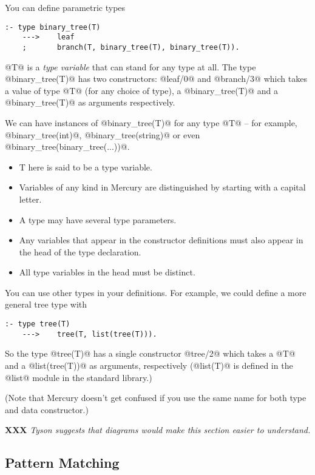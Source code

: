 \documentclass[a4paper,11pt,notitlepage,onecolumn]{article}
\newcommand{\XXX}[1]%
{{\small\textbf{XXX} \emph{#1}}}
\begin{document}
You can define parametric types
\begin{verbatim}
:- type binary_tree(T)
    --->    leaf
    ;       branch(T, binary_tree(T), binary_tree(T)).
\end{verbatim}

@T@ is a \emph{type variable} that can stand for any type at all.
The type @binary_tree(T)@ has two constructors: @leaf/0@ and
@branch/3@ which takes a value of type @T@ (for any choice of
type), a @binary_tree(T)@ and a @binary_tree(T)@ as arguments
respectively.

We can have instances of @binary_tree(T)@ for any type @T@ -- for
example, @binary_tree(int)@, @binary_tree(string)@ or even
@binary_tree(binary_tree(...))@.

\begin{itemize}
\item T here is said to be a type variable.
\item Variables of any kind in Mercury are distinguished by
  starting with a capital letter.
\item A type may have several type parameters.
\item Any variables that appear in the constructor definitions
  must also appear in the head of the type declaration.
\item All type variables in the head must be distinct.
\end{itemize}

You can use other types in your definitions.  For example, we
could define a more general tree type with
\begin{verbatim}
:- type tree(T)
    --->    tree(T, list(tree(T))).
\end{verbatim}
So the type @tree(T)@ has a single constructor @tree/2@ which
takes a @T@ and a @list(tree(T))@ as arguments, respectively
(@list(T)@ is defined in the @list@ module in the standard
library.)

(Note that Mercury doesn't get confused if you use the same
name for both type and data constructor.)

\XXX{Tyson suggests that diagrams would make this section
easier to understand.}

\subsection{Pattern Matching}
\end{document}
